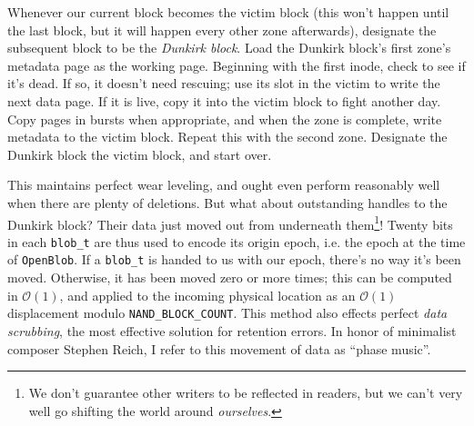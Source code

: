 \documentclass[letterpaper,10pt]{article}
\begin{document}
Whenever our current block becomes the victim block (this won't happen until the
last block, but it will happen every other zone afterwards), designate the subsequent
block to be the \textit{Dunkirk block}. Load the Dunkirk block's first zone's
metadata page as the working page. Beginning with the first inode, check to
see if it's dead. If so, it doesn't need rescuing; use its slot in the victim
to write the next data page. If it is live, copy it into the victim block to
fight another day. Copy pages in bursts when appropriate, and when the zone is
complete, write metadata to the victim block. Repeat this with the second zone.
Designate the Dunkirk block the victim block, and start over.

This maintains perfect wear leveling, and ought even perform reasonably well
when there are plenty of deletions. But what about outstanding handles to the
Dunkirk block? Their data just moved out from underneath them\footnote{We don't
guarantee other writers to be reflected in readers, but we can't very well
go shifting the world around \textit{ourselves}.}! Twenty bits in
each \texttt{blob\_t} are thus used to encode its origin epoch, i.e. the epoch
at the time of \texttt{OpenBlob}. If a \texttt{blob\_t} is handed to us with
our epoch, there's no way it's been moved. Otherwise, it has been moved zero or
more times; this can be computed in $\mathcal{O}(1)$, and applied to the incoming physical
location as an $\mathcal{O}(1)$ displacement modulo \texttt{NAND\_BLOCK\_COUNT}. This
method also effects perfect \textit{data scrubbing}\parencite{management},
the most effective solution for retention errors. In honor of minimalist
composer Stephen Reich, I refer to this movement of data as ``phase music''.
\end{document}
